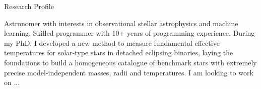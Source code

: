 \begin{rubric}{Research Profile}

\begin{minipage}{0.98\linewidth}
Astronomer with interests in observational stellar astrophysics and machine learning.
Skilled programmer with 10+ years of programming experience.
During my PhD, I developed a new method to measure fundamental effective temperatures for solar-type stars in detached eclipsing binaries, laying the foundations to build a homogeneous catalogue of benchmark stars with extremely precise model-independent masses, radii and temperatures.
I am looking to work on ...

\end{minipage}
\end{rubric}